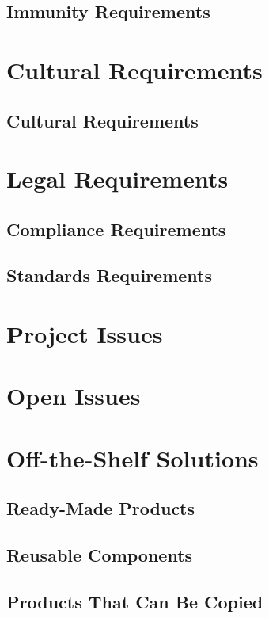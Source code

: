 \documentclass{article}
\begin{document}
\subsection{Immunity Requirements}


\section{Cultural Requirements}
\subsection{Cultural Requirements}


\section{Legal Requirements}
\subsection{Compliance Requirements}


\subsection{Standards Requirements}


\section*{Project Issues}

\section{Open Issues}

\section{Off-the-Shelf Solutions}

\subsection{Ready-Made Products}


\subsection{Reusable Components}


\subsection{Products That Can Be Copied}
\end{document}
